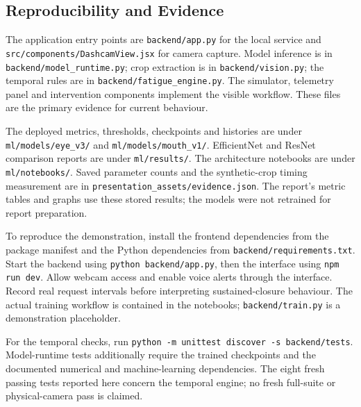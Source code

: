 \documentclass[pdflatex,sn-mathphys-num]{sn-jnl}
\begin{document}
\begin{appendices}
\section{Reproducibility and Evidence}\label{app:reproducibility}
The application entry points are \texttt{backend/app.py} for the local service and \texttt{src/components/DashcamView.jsx} for camera capture. Model inference is in \texttt{backend/model\_runtime.py}; crop extraction is in \texttt{backend/vision.py}; the temporal rules are in \texttt{backend/fatigue\_engine.py}. The simulator, telemetry panel and intervention components implement the visible workflow. These files are the primary evidence for current behaviour.

The deployed metrics, thresholds, checkpoints and histories are under \texttt{ml/models/eye\_v3/} and \texttt{ml/models/mouth\_v1/}. EfficientNet and ResNet comparison reports are under \texttt{ml/results/}. The architecture notebooks are under \texttt{ml/notebooks/}. Saved parameter counts and the synthetic-crop timing measurement are in \texttt{presentation\_assets/evidence.json}. The report's metric tables and graphs use these stored results; the models were not retrained for report preparation.

To reproduce the demonstration, install the frontend dependencies from the package manifest and the Python dependencies from \texttt{backend/requirements.txt}. Start the backend using \texttt{python backend/app.py}, then the interface using \texttt{npm run dev}. Allow webcam access and enable voice alerts through the interface. Record real request intervals before interpreting sustained-closure behaviour. The actual training workflow is contained in the notebooks; \texttt{backend/train.py} is a demonstration placeholder.

For the temporal checks, run \texttt{python -m unittest discover -s backend/tests}. Model-runtime tests additionally require the trained checkpoints and the documented numerical and machine-learning dependencies. The eight fresh passing tests reported here concern the temporal engine; no fresh full-suite or physical-camera pass is claimed.
\end{appendices}

\begingroup
{}

\endgroup
\end{document}
